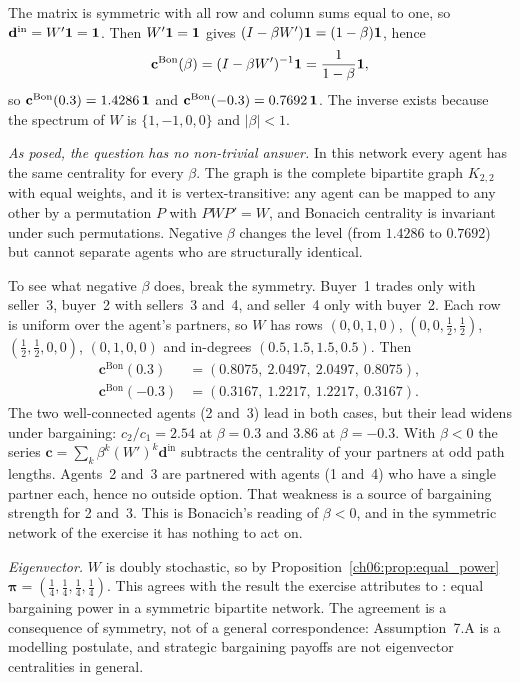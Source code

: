 \documentclass[../solutions_manual.tex]{subfiles}
\begin{document}

 The matrix is symmetric with all row and column sums equal to one, so $\mathbf{d}^{\text{in}} = W'\mathbf{1} = \mathbf{1}$. Then $W'\mathbf{1} = \mathbf{1}$ gives $(I - \beta W')\mathbf{1} = (1-\beta)\mathbf{1}$, hence
\[
\mathbf{c}^{\text{Bon}}(\beta) = (I-\beta W')^{-1}\mathbf{1} = \frac{1}{1-\beta}\mathbf{1},
\]
so $\mathbf{c}^{\text{Bon}}(0.3) = 1.4286\,\mathbf{1}$ and $\mathbf{c}^{\text{Bon}}(-0.3) = 0.7692\,\mathbf{1}$.
The inverse exists because the spectrum of $W$ is $\{1, -1, 0, 0\}$ and $|\beta| < 1$.

 \emph{As posed, the question has no non-trivial answer.} In this network every agent has the same centrality for every $\beta$. The graph is the complete bipartite graph $K_{2,2}$ with equal weights, and it is vertex-transitive: any agent can be mapped to any other by a permutation $P$ with $PWP' = W$, and Bonacich centrality is invariant under such permutations. Negative $\beta$ changes the level (from $1.4286$ to $0.7692$) but cannot separate agents who are structurally identical.

To see what negative $\beta$ does, break the symmetry. Buyer~1 trades only with seller~3, buyer~2 with sellers~3 and~4, and seller~4 only with buyer~2. Each row is uniform over the agent's partners, so $W$ has rows $(0,0,1,0)$, $(0,0,\frac12,\frac12)$, $(\frac12,\frac12,0,0)$, $(0,1,0,0)$ and in-degrees $(0.5, 1.5, 1.5, 0.5)$. Then
\begin{align*}
\mathbf{c}^{\text{Bon}}(0.3) &= (0.8075,\ 2.0497,\ 2.0497,\ 0.8075),\\
\mathbf{c}^{\text{Bon}}(-0.3) &= (0.3167,\ 1.2217,\ 1.2217,\ 0.3167).
\end{align*}
The two well-connected agents (2 and~3) lead in both cases, but their lead widens under bargaining: $c_2/c_1 = 2.54$ at $\beta = 0.3$ and $3.86$ at $\beta = -0.3$. With $\beta < 0$ the series $\mathbf{c} = \sum_k \beta^k (W')^{k}\mathbf{d}^{\text{in}}$ subtracts the centrality of your partners at odd path lengths. Agents~2 and~3 are partnered with agents (1 and~4) who have a single partner each, hence no outside option. That weakness is a source of bargaining strength for 2 and~3. This is Bonacich's reading of $\beta < 0$, and in the symmetric network of the exercise it has nothing to act on.

 \emph{Eigenvector.} $W$ is doubly stochastic, so by Proposition~\ref{ch06:prop:equal_power} $\boldsymbol{\pi} = (\frac14, \frac14, \frac14, \frac14)$. This agrees with the result the exercise attributes to \citet{manea2011bargaining}: equal bargaining power in a symmetric bipartite network. The agreement is a consequence of symmetry, not of a general correspondence: Assumption~7.A is a modelling postulate, and strategic bargaining payoffs are not eigenvector centralities in general.
\end{document}
